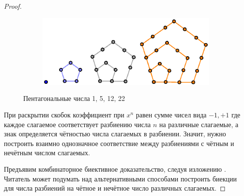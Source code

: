 \documentclass{article}
\theoremstyle{definition}
\begin{document}
\begin{proof}
\begin{figure}[h]
\centering
\begin{subfigure}{.8\textwidth}
	\centering
	\includegraphics[width=.7\textwidth]{pentagonal}
\end{subfigure}%
\caption{Пентагональные числа 1, 5, 12, 22}
\label{fig:pentagonal}	
\end{figure}
	При раскрытии скобок коэффициент при \( x^n \) равен сумме чисел вида \( 
	-1, +1 \) где каждое слагаемое соответствует разбиению числа \( n \) на 
	различные слагаемые, а знак определяется чётностью числа слагаемых в 
	разбиении. Значит, нужно построить взаимно однозначное соответствие между 
	разбиениями с чётным и нечётным числом слагаемых.
	
	Предъявим комбинаторное биективное доказательство, следуя изложению 
	\cite[Proposition 1.8.7]{stanley1}. Читатель может подумать над 
	альтернативными способами построить биекции для числа разбиений на чётное и 
	нечётное число различных слагаемых.
	

\end{proof}
\end{document}
